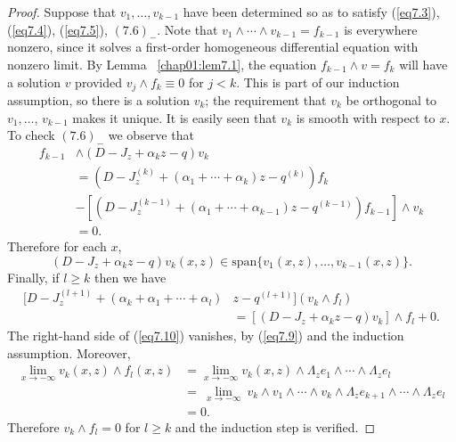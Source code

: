 \documentclass{surv-l}
\theoremstyle{plain}
\theoremstyle{definition}
\numberwithin{equation}{chapter}
\begin{document}
\begin{proof}
Suppose that $ v_{1},\ldots,v_{k-1}$ have been determined so as to satisfy (\ref{eq7.3}), (\ref{eq7.4}), (\ref{eq7.5}), $(7.6)_{-}$. Note that $ v_{1}\wedge\cdots\wedge v_{k-1}=f_{k-1}$ is everywhere nonzero, since it solves a first-order homogeneous differential equation with nonzero limit. By Lemma ~\ref{chap01:lem7.1}, the equation $f_{k-1}\wedge v=f_{k}$ will have a solution $v$ provided $v_{j}\wedge f_{k} \equiv 0$ for $j<k$. This is part of our induction assumption, so there is a solution $v_{k}$; the requirement that $v_{k}$ be orthogonal to $ v_{1},\ldots$, $v_{k-1}$ makes it unique. It is easily seen that $v_{k}$ is smooth with respect to $x$. To check $(7.6)_{-}$ we observe that
\begin{align*}
f_{k-1}&\wedge(D-J_{z}+\alpha_{k}z-q)v_{k}\\
&=(D-J_{z}^{(k)}+ (\alpha_{1}+\cdots+\alpha_{k})z-q^{(k)})f_{k}\\
&-[(D-J_{z}^{(k-1)}+ (\alpha_{1}+\cdots+\alpha_{k-1})z-q^{(k-1)})f_{k-1}]\wedge v_{k}\\
&=0.
\end{align*}
Therefore for each $x$,
\begin{equation}\label{eq7.9}
(D-J_{z}+\alpha_{k}z-q)v_{k}(x, z)\in \mathrm{span}\{v_{1}(x, z),\ldots,v_{k-1}(x, z)\}.
\end{equation}
Finally, if $l\geq k$ then we have
\begin{align}\label{eq7.10}
[D-J_{z}^{(l+1)}+(\alpha_{k}+\alpha_{1}+\cdots+\alpha_{l})&z-q^{(l+1)}](v_{k}\wedge f_{l})\\
&=[(D-J_{z}+\alpha_{k}z-q)v_{k}]\wedge f_{l}+0.\nonumber
\end{align}
The right-hand side of (\ref{eq7.10}) vanishes, by (\ref{eq7.9}) and the induction assumption. Moreover,
\begin{align*}
\displaystyle \lim_{x\rightarrow-\infty} v_{k}(x, z)\wedge f_{l}(x, z)&= \displaystyle \lim_{x\rightarrow-\infty}  v_{k}(x,z)\wedge\Lambda_{z}e_{1}\wedge\cdots\wedge\Lambda_{z}e_{l}\\
&=\ \lim_{x\rightarrow-\infty}\  v_{k}\wedge v_{1}\wedge\cdots\wedge v_{k}\wedge\Lambda_{z}e_{k+1}\wedge\cdots\wedge\Lambda_{z}e_{l}\\
&=0.
\end{align*}
Therefore $v_{k}\wedge f_{l}=0$ for $l\geq k$ and the induction step is verified.
\end{proof}
\end{document}

